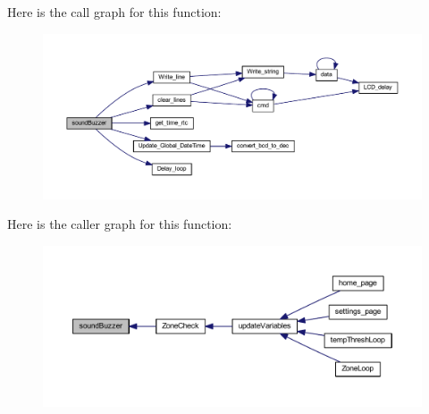 Here is the call graph for this function\+:
\nopagebreak
\begin{figure}[H]
\begin{center}
\leavevmode
\includegraphics[width=350pt]{a00011_a31aed89a0638f80bd71a31c50f5cb3ff_cgraph}
\end{center}
\end{figure}
Here is the caller graph for this function\+:
\nopagebreak
\begin{figure}[H]
\begin{center}
\leavevmode
\includegraphics[width=350pt]{a00011_a31aed89a0638f80bd71a31c50f5cb3ff_icgraph}
\end{center}
\end{figure}
